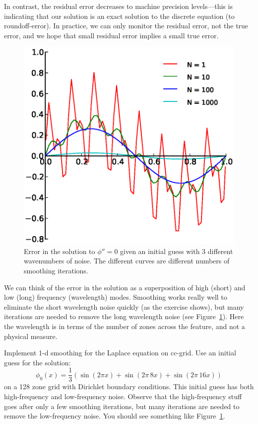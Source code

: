 In contrast, the residual error decreases to machine precision
levels---this is indicating that our solution is an exact solution to
the discrete equation (to roundoff-error).
In practice, we can only monitor the residual error, not the true
error, and we hope that small residual error implies a small true
error.

\begin{figure}[t]
\centering
\includegraphics[width=0.8\linewidth]{smooth_error}
\caption[Smoothing of different wavenumbers.]{\label{fig:smooth} Error
  in the solution to $\phi'' = 0$ given an initial guess with 3
  different wavenumbers of noise.  The different curves are different
  numbers of smoothing iterations.}
\end{figure}

We can think of the error in the solution as a superposition of high
(short) and low (long) frequency (wavelength) modes.  Smoothing works
really well to eliminate the short wavelength noise quickly (as the
exercise shows), but many iterations are needed to remove the long
wavelength noise (see Figure~\ref{fig:smooth}).  Here the wavelength
is in terms of the number of zones across the feature, and not a
physical measure.  

\begin{exercise}
{Implement 1-d smoothing for the Laplace equation on
  cc-grid.  Use an initial guess for the solution:
  \begin{equation}
  \phi_0(x) = \frac{1}{3} ( \sin(2\pi x) + \sin(2\pi \, 8 x) + \sin(2\pi \, 16 x) )
  \end{equation}
  on a 128 zone grid with Dirichlet boundary conditions.  This initial
  guess has both high-frequency and low-frequency noise.  Observe that
  the high-frequency stuff goes after only a few smoothing iterations,
  but many iterations are needed to remove the low-frequency noise.
  You should see something like Figure~\ref{fig:smooth}.
}
\end{exercise}

